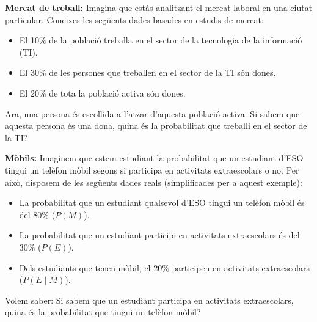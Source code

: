 \documentclass[12pt]{article}
\begin{document}
\begin{exercici} \noindent 
\textbf{Mercat de treball:} Imagina que estàs analitzant el mercat laboral en una ciutat particular. Coneixes les següents dades basades en estudis de mercat:

\begin{itemize}
    \item El 10\% de la població treballa en el sector de la tecnologia de la informació (TI).
    \item El 30\% de les persones que treballen en el sector de la TI són dones.
    \item El 20\% de tota la població activa són dones.
\end{itemize}

Ara, una persona és escollida a l'atzar d'aquesta població activa. Si sabem que aquesta persona és una dona, quina és la probabilitat que treballi en el sector de la TI?
\end{exercici}

\begin{exercici} \noindent 
\textbf{Mòbils:} Imaginem que estem estudiant la probabilitat que un estudiant d'ESO tingui un telèfon mòbil segons si participa en activitats extraescolars o no. Per això, disposem de les següents dades reals (simplificades per a aquest exemple):

\begin{itemize}
    \item La probabilitat que un estudiant qualsevol d'ESO tingui un telèfon mòbil és del 80\% ($P(M)$).
    \item La probabilitat que un estudiant participi en activitats extraescolars és del 30\% ($P(E)$).
    \item Dels estudiants que tenen mòbil, el 20\% participen en activitats extraescolars ($P(E \mid M)$).
\end{itemize}

Volem saber: Si sabem que un estudiant participa en activitats extraescolars, quina és la probabilitat que tingui un telèfon mòbil?
\end{exercici}
\end{document}
